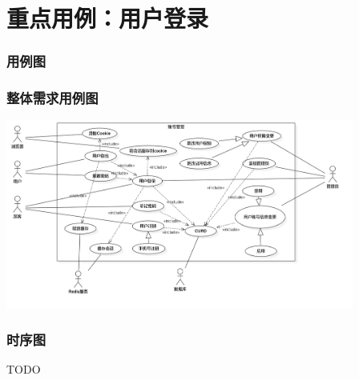 \section{重点用例：用户登录}
\begin{frame}
    \frametitle{用例图}
    \frametitle{整体需求用例图}
    \center
    \includegraphics[width=4.5in]{contents/figure/login_usecase_diagram.png}
\end{frame}
\begin{frame}
    \frametitle{时序图}
    TODO
\end{frame}